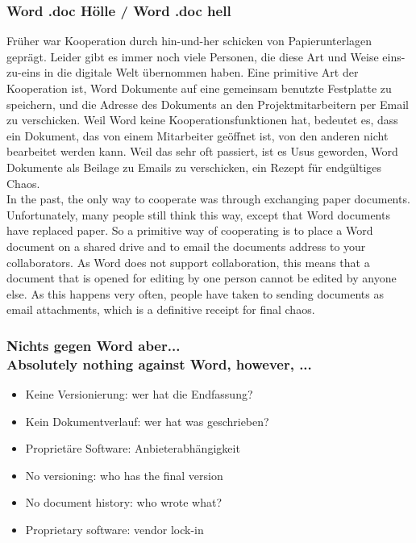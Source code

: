 {\scriptsize
\begin{frame}
  \frametitle{Word\textsuperscript{\tiny\textregistered} .doc Hölle /
    \textcolor{mfn_green}{Word\textsuperscript{\tiny\textregistered} .doc hell}}
Früher war Kooperation durch hin-und-her schicken von Papierunterlagen geprägt. Leider gibt es immer noch viele Personen, die diese Art und Weise eins-zu-eins in die digitale Welt übernommen haben. Eine primitive Art der Kooperation ist, Word Dokumente auf eine gemeinsam benutzte Festplatte zu speichern, und die Adresse des Dokuments an den Projektmitarbeitern per Email zu verschicken. Weil Word keine Kooperationsfunktionen hat, bedeutet es, dass ein Dokument, das von einem Mitarbeiter geöffnet ist, von den anderen nicht bearbeitet werden kann. Weil das sehr oft passiert, ist es Usus geworden, Word Dokumente als Beilage zu Emails zu verschicken, ein Rezept für endgültiges Chaos.\\
  \bigskip
  \textcolor{mfn_green}{In the past, the only way to cooperate was through exchanging paper documents. Unfortunately, many people still think this way, except that Word documents have replaced paper. So a primitive way of cooperating is to place a Word document on a shared drive and to email the documents address to your collaborators. As Word does not support collaboration, this means that a document that is opened for editing by one person cannot be edited by anyone else. As this happens very often, people have taken to sending documents as email attachments, which is a definitive receipt for final chaos.}
\end{frame}
}
\begin{frame}
  \frametitle{Nichts gegen Word\textsuperscript{\tiny\textregistered} aber... \\
    \textcolor{mfn_green}{Absolutely nothing against Word\textsuperscript{\tiny\textregistered}, however, ...}}
  \begin{itemize}
  \item{Keine Versionierung: wer hat die Endfassung?}
  \item{Kein Dokumentverlauf: wer hat was geschrieben?}
  \item{Proprietäre Software: Anbieterabhängigkeit}
  \end{itemize}
  
  \begin{itemize}
  \item{\textcolor{mfn_green}{No versioning: who has the final version}}
  \item{\textcolor{mfn_green}{No document history: who wrote what?}}
  \item{\textcolor{mfn_green}{Proprietary software: vendor lock-in}}
  \end{itemize}
\end{frame}

